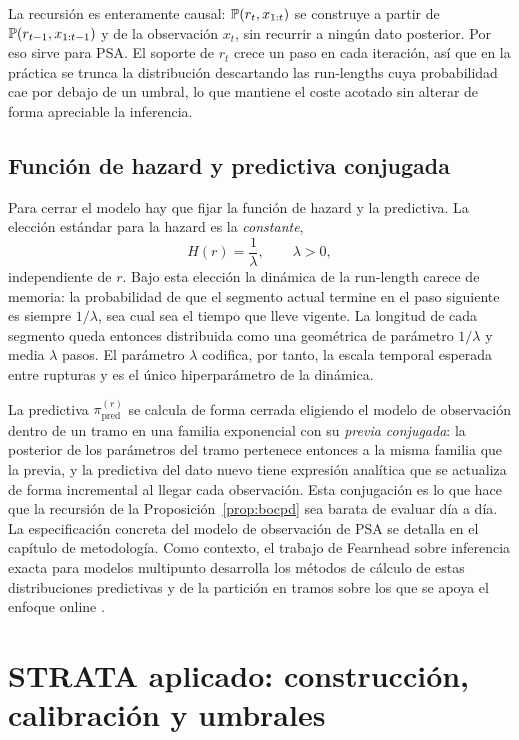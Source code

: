 La recursión es enteramente causal: $\mathbb{P}(r_t, x_{1:t})$ se construye a partir de $\mathbb{P}(r_{t-1}, x_{1:t-1})$ y de la observación $x_t$, sin recurrir a ningún dato posterior. Por eso sirve para PSA. El soporte de $r_t$ crece un paso en cada iteración, así que en la práctica se trunca la distribución descartando las run-lengths cuya probabilidad cae por debajo de un umbral, lo que mantiene el coste acotado sin alterar de forma apreciable la inferencia.

\subsection{Función de hazard y predictiva conjugada}
\label{sec:bocpd-hazard}

Para cerrar el modelo hay que fijar la función de hazard y la predictiva. La elección estándar para la hazard es la \emph{constante},
\[
H(r) = \frac{1}{\lambda}, \qquad \lambda > 0,
\]
independiente de $r$. Bajo esta elección la dinámica de la run-length carece de memoria: la probabilidad de que el segmento actual termine en el paso siguiente es siempre $1/\lambda$, sea cual sea el tiempo que lleve vigente. La longitud de cada segmento queda entonces distribuida como una geométrica de parámetro $1/\lambda$ y media $\lambda$ pasos. El parámetro $\lambda$ codifica, por tanto, la escala temporal esperada entre rupturas y es el único hiperparámetro de la dinámica.

La predictiva $\pi^{(r)}_{\mathrm{pred}}$ se calcula de forma cerrada eligiendo el modelo de observación dentro de un tramo en una familia exponencial con su \emph{previa conjugada}: la posterior de los parámetros del tramo pertenece entonces a la misma familia que la previa, y la predictiva del dato nuevo tiene expresión analítica que se actualiza de forma incremental al llegar cada observación. Esta conjugación es lo que hace que la recursión de la Proposición~\ref{prop:bocpd} sea barata de evaluar día a día. La especificación concreta del modelo de observación de PSA se detalla en el capítulo de metodología. Como contexto, el trabajo de Fearnhead sobre inferencia exacta para modelos multipunto desarrolla los métodos de cálculo de estas distribuciones predictivas y de la partición en tramos sobre los que se apoya el enfoque online \cite{fearnhead2006}.

\section{STRATA aplicado: construcción, calibración y umbrales}
\label{sec:strata-aplicado}

